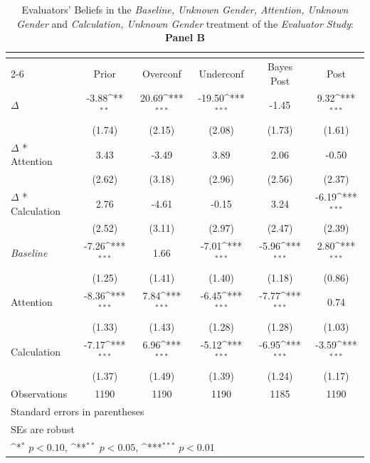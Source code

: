 \begin{table}[htbp]\centering
\def\sym#1{\ifmmode^{#1}\else\(^{#1}\)\fi}
\caption{Evaluators' Beliefs in the \textit{Baseline, Unknown Gender, Attention, Unknown Gender} and \textit{Calculation, Unknown Gender} treatment of the \textit{Evaluator Study}: \textbf{Panel B}}
\begin{tabular}{l*{5}{c}}
\hline\hline
                &\multicolumn{5}{c}{}                                                                          \\\cmidrule(lr){2-6}
                &\multicolumn{1}{c}{Prior}&\multicolumn{1}{c}{Overconf}&\multicolumn{1}{c}{Underconf}&\multicolumn{1}{c}{Bayes Post}&\multicolumn{1}{c}{Post}\\
\hline
$\Delta$        &    -3.88\sym{**} &    20.69\sym{***}&   -19.50\sym{***}&    -1.45         &     9.32\sym{***}\\
                &   (1.74)         &   (2.15)         &   (2.08)         &   (1.73)         &   (1.61)         \\
$\Delta$ * Attention&     3.43         &    -3.49         &     3.89         &     2.06         &    -0.50         \\
                &   (2.62)         &   (3.18)         &   (2.96)         &   (2.56)         &   (2.37)         \\
$\Delta$ * Calculation&     2.76         &    -4.61         &    -0.15         &     3.24         &    -6.19\sym{***}\\
                &   (2.52)         &   (3.11)         &   (2.97)         &   (2.47)         &   (2.39)         \\
\textit{Baseline}&    -7.26\sym{***}&     1.66         &    -7.01\sym{***}&    -5.96\sym{***}&     2.80\sym{***}\\
                &   (1.25)         &   (1.41)         &   (1.40)         &   (1.18)         &   (0.86)         \\
Attention       &    -8.36\sym{***}&     7.84\sym{***}&    -6.45\sym{***}&    -7.77\sym{***}&     0.74         \\
                &   (1.33)         &   (1.43)         &   (1.28)         &   (1.28)         &   (1.03)         \\
Calculation     &    -7.17\sym{***}&     6.96\sym{***}&    -5.12\sym{***}&    -6.95\sym{***}&    -3.59\sym{***}\\
                &   (1.37)         &   (1.49)         &   (1.39)         &   (1.24)         &   (1.17)         \\
\hline
Observations    &     1190         &     1190         &     1190         &     1185         &     1190         \\
\hline\hline
\multicolumn{6}{l}{\footnotesize Standard errors in parentheses}\\
\multicolumn{6}{l}{\footnotesize SEs are robust}\\
\multicolumn{6}{l}{\footnotesize \sym{*} \(p<0.10\), \sym{**} \(p<0.05\), \sym{***} \(p<0.01\)}\\
\end{tabular}
\end{table}
